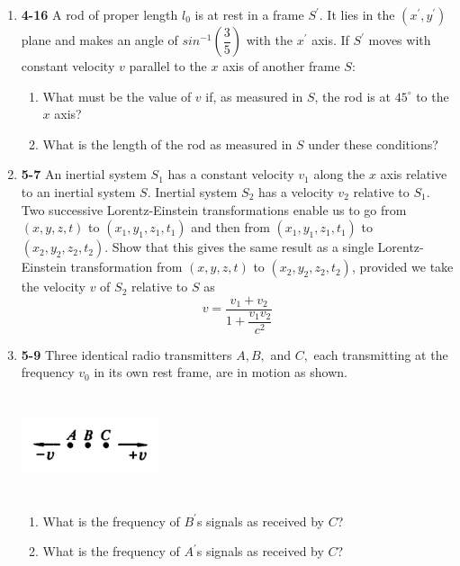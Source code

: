 \documentclass[fleqn]{article}
\begin{document}
  \begin{enumerate}
    \item \textbf{4-16} A rod of proper length $l_0$ is at rest in a frame $S^'$. It lies in the $(x^',y^')$ plane and makes
    an angle of $sin^{-1}(\dfrac{3}{5})$ with the $x^'$ axis. If $S^'$ moves with constant velocity $v$ parallel to the 
    $x$ axis of another frame $S:$
    \begin{enumerate}
      \item What must be the value of $v$ if, as measured in $S$, the rod is at $45^\circ$ to the $x$ axis?


      \item What is the length of the rod as measured in $S$ under these conditions?
    \end{enumerate}


    \item \textbf{5-7} An inertial system $S_1$ has a constant velocity $v_1$ along the $x$ axis relative to an inertial system $S$.
    Inertial system $S_2$ has a velocity $v_2$ relative to $S_1$. Two successive Lorentz-Einstein transformations enable us to
    go from $(x, y, z, t)$ to $(x_1, y_1, z_1, t_1)$ and then from $(x_1, y_1, z_1, t_1)$ to $(x_2, y_2, z_2, t_2)$. Show that 
    this gives the same result as a single Lorentz-Einstein transformation from $(x, y, z, t)$ to $(x_2, y_2, z_2, t_2)$,
    provided we take the velocity $v$ of $S_2$ relative to $S$ as
    $$v=\dfrac{v_1+v_2}{1+\dfrac{v_1 v_2}{c^2}}$$


    \item \textbf{5-9} Three identical radio transmitters $A, B,$ and $C,$ each transmitting at the frequency $v_0$ in its own
    rest frame, are in motion as shown.

    \includegraphics[height=3cm, width=4cm]{1.JPG}

    \begin{enumerate}
      \item What is the frequency of $B^'$s signals as received by $C$?


      \item What is the frequency of $A^'$s signals as received by $C$?
    \end{enumerate}


  \end{enumerate}
\end{document}
